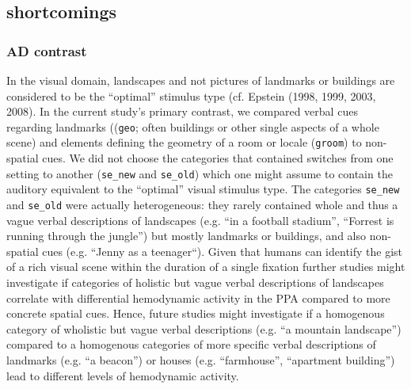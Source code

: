 \documentclass[english]{article}
\begin{document}

\subsection{shortcomings}



\subsubsection{AD contrast}

In the visual domain, landscapes and not pictures of landmarks or buildings are
considered to be the ``optimal'' stimulus type (cf. Epstein (1998, 1999, 2003,
2008).
In the current study's primary contrast, we compared verbal cues regarding
landmarks ((\texttt{geo}; often buildings or other single aspects of a whole
scene) and elements defining the geometry of a room or locale (\texttt{groom}) to non-spatial cues.
We did not choose the categories that contained switches from one setting to
another (\texttt{se\_new} and \texttt{se\_old}) which one might assume to
contain the auditory equivalent to the ``optimal'' visual stimulus type.
The categories \texttt{se\_new} and \texttt{se\_old} were actually
heterogeneous: they rarely contained whole and thus a vague verbal descriptions
of landscapes (e.g. ``in a football stadium'', ``Forrest is running through the
jungle'') but mostly landmarks or buildings, and also non-spatial
cues (e.g. ``Jenny as a teenager``).
Given that humans can identify the gist of a rich visual scene within the
duration of a single fixation \citep{henderson2003human} further studies might
investigate if categories of holistic but vague verbal descriptions of
landscapes correlate with differential hemodynamic activity in the PPA compared
to more concrete spatial cues.
Hence, future studies might investigate if a homogenous category of wholistic
but vague verbal descriptions (e.g. ``a mountain landscape'') compared to a
homogenous categories of more specific verbal descriptions of landmarks (e.g.
``a beacon'') or houses (e.g. ``farmhouse'', ``apartment building'') lead to
different levels of hemodynamic activity.
\end{document}
